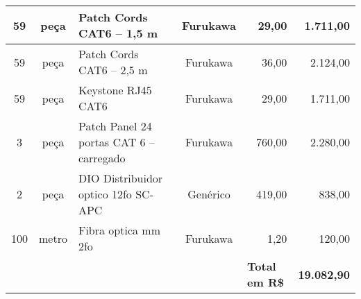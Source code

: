 \begin{table}[H]
{\begin{tabular}{cclc|r|r|}
		\multicolumn{1}{|c|}{59}                  & \multicolumn{1}{c|}{peça}             & \multicolumn{1}{l|}{Patch Cords CAT6 – 1,5 m}                                     & Furukawa              & 29,00                                              & 1.711,00                                        \\ \hline
		\multicolumn{1}{|c|}{59}                  & \multicolumn{1}{c|}{peça}             & \multicolumn{1}{l|}{Patch Cords CAT6 – 2,5 m}                                     & Furukawa              & 36,00                                              & 2.124,00                                        \\ \hline
		\multicolumn{1}{|c|}{59}                  & \multicolumn{1}{c|}{peça}             & \multicolumn{1}{l|}{Keystone RJ45 CAT6}                                           & Furukawa              & 29,00                                              & 1.711,00                                        \\ \hline
		\multicolumn{1}{|c|}{3}                   & \multicolumn{1}{c|}{peça}             & \multicolumn{1}{l|}{Patch Panel 24 portas CAT 6 – carregado}                      & Furukawa              & 760,00                                             & 2.280,00                                        \\ \hline
		\multicolumn{1}{|c|}{2}                   & \multicolumn{1}{c|}{peça}             & \multicolumn{1}{l|}{DIO Distribuidor optico 12fo SC-APC}                          & Genérico              & 419,00                                             & 838,00                                          \\ \hline
		\multicolumn{1}{|c|}{100}                 & \multicolumn{1}{c|}{metro}            & \multicolumn{1}{l|}{Fibra optica mm 2fo}                                          & Furukawa              & 1,20                                               & 120,00                                          \\ \hline
		\multicolumn{1}{l}{}                      & \multicolumn{1}{l}{}                  &                                                                                   & \multicolumn{1}{l|}{} & \multicolumn{1}{l|}{\textbf{Total em R\$}}         & \textbf{19.082,90}                              \\ \cline{5-6} 
	\end{tabular}}
\end{table}